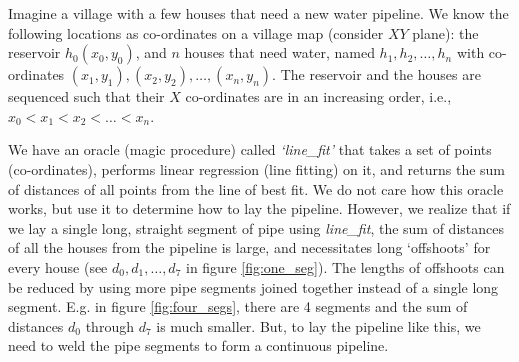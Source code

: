 \documentclass[addpoints]{exam}
\begin{document}
\begin{questions}
\begin{parts}
\end{parts}


Imagine a village with a few houses that need a new water pipeline. We know the following locations as co-ordinates on a village map (consider $XY$ plane): the reservoir $h_0 (x_0,y_0)$, and $n$ houses that need water, named $h_1, h_2, \dots, h_n$ with co-ordinates $(x_1, y_1), (x_2, y_2), \dots, (x_n, y_n)$. The reservoir and the houses are sequenced such that their $X$ co-ordinates are in an increasing order, i.e., $x_0 < x_1< x_2 < \dots < x_n$.

We have an oracle (magic procedure) called \textit{`line\_fit'} that takes a set of points (co-ordinates), performs linear regression (line fitting) on it, and returns the sum of distances of all points from the line of best fit. We do not care how this oracle works, but use it to determine how to lay the pipeline. However, we realize that if we lay a single long, straight segment of pipe using \textit{line\_fit}, the sum of distances of all the houses from the pipeline is large, and necessitates long `offshoots' for every house (see $d_0, d_1, \dots, d_7$ in figure \ref{fig:one_seg}). The lengths of offshoots can be reduced by using more pipe segments joined together instead of a single long segment. E.g. in figure \ref{fig:four_segs}, there are 4 segments and the sum of distances $d_0$ through $d_7$ is much smaller. But, to lay the pipeline like this, we need to weld the pipe segments to form a continuous pipeline.


\end{questions}
\end{document}
